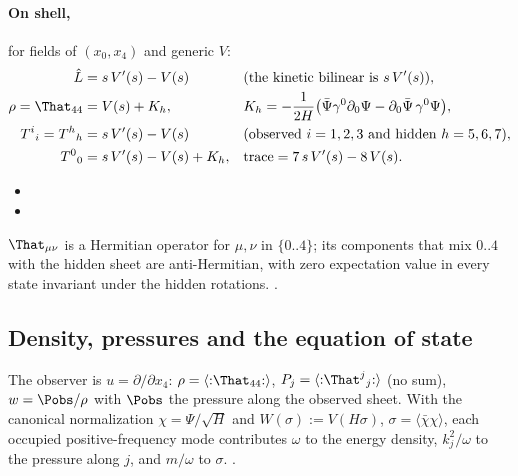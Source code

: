 \paragraph{On shell,} for fields of $(x_0,x_4)$ and generic $V$:
\begin{align*}
  \hat L&=s\,V'(s)-V(s) &&\text{(the kinetic bilinear is } s\,V'(s)\text{)},\\
  \rho=\That_{44}&=V(s)+K_h, &&K_h=-\frac{1}{2H}\bigl(\bar\Psi\gamma^0\partial_0\Psi-\partial_0\bar\Psi\,\gamma^0\Psi\bigr),\\
  T^i{}_i=T^h{}_h&=s\,V'(s)-V(s) &&\text{(observed } i=1,2,3\text{ and hidden } h=5,6,7\text{)},\\
  T^0{}_0&=s\,V'(s)-V(s)+K_h, &&\text{trace}=7\,s\,V'(s)-8\,V(s).
\end{align*}
\begin{itemize}
  \item {}
  \item {}
\end{itemize}
$\That_{\mu\nu}$ is a Hermitian operator for $\mu,\nu$ in $\{0..4\}$; its components that mix $0..4$ with
the hidden sheet are anti-Hermitian, with zero expectation value in every state invariant under the
hidden rotations.  .

\subsection{Density, pressures and the equation of state}
\label{sec:3.6}

The observer is $u=\partial/\partial x_4$: $\rho=\langle{:}\That_{44}{:}\rangle$,
$P_j=\langle{:}\That^j{}_j{:}\rangle$ (no sum), $w=\Pobs/\rho$ with $\Pobs$ the pressure along the
observed sheet. With the canonical normalization $\chi=\Psi/\sqrt H$ and $W(\sigma):=V(H\sigma)$,
$\sigma=\langle\bar\chi\chi\rangle$, each occupied positive-frequency mode contributes $\omega$ to the
energy density, $k_j^2/\omega$ to the pressure along $j$, and $m/\omega$ to $\sigma$.
 .

